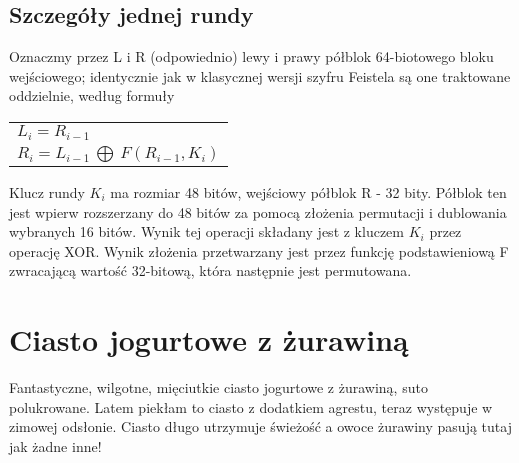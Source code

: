 \documentclass[12pt, letterpaper, titlepage]{article}
\begin{document}
\subsection{Szczegóły jednej rundy}
Oznaczmy przez L i R (odpowiednio) lewy i prawy półblok 64-biotowego bloku wejściowego;
identycznie jak w klasycznej wersji szyfru Feistela są one traktowane oddzielnie, według formuły
\begin{center}
\begin{tabular}{l}
$L_i = R_{i-1}$ \\
$R_i = L_{i-1} \ \bigoplus \	 F(R_{i-1}, K_i)$  
\end{tabular}
\end{center}
Klucz rundy $K_i$ ma rozmiar 48 bitów, wejściowy półblok R - 32 bity. Półblok ten jest wpierw
rozszerzany do 48 bitów za pomocą złożenia permutacji i dublowania wybranych 16 bitów.
Wynik tej operacji składany jest z kluczem $K_i$ przez operację XOR. Wynik złożenia przetwarzany jest przez funkcję podstawieniową F zwracającą wartość 32-bitową, która następnie
jest permutowana.
\newpage
\section{Ciasto jogurtowe z żurawiną}
Fantastyczne, wilgotne, mięciutkie ciasto jogurtowe z żurawiną, suto polukrowane. Latem
piekłam to ciasto z dodatkiem agrestu, teraz występuje w zimowej odsłonie. Ciasto długo
utrzymuje świeżość a owoce żurawiny pasują tutaj jak żadne inne! \cite{ciasto}
\end{document}
